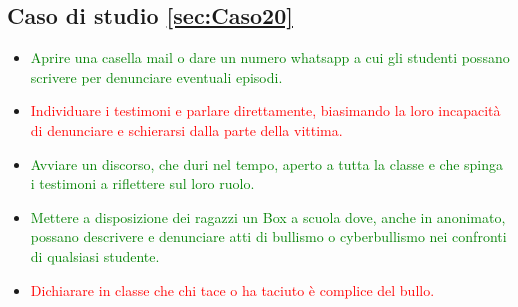\documentclass{article}
\begin{document}
\subsection{Caso di studio \ref{sec:Caso20}}
\begin{itemize}
	\item \textcolor{green}{Aprire una casella mail o dare un numero whatsapp a cui gli studenti possano scrivere per denunciare eventuali episodi.}		
	\item \textcolor{red}{Individuare i testimoni e parlare direttamente, biasimando la loro incapacità di denunciare e schierarsi dalla parte della vittima.}		
	\item \textcolor{green}{Avviare un discorso, che duri nel tempo, aperto a tutta la classe e che spinga i testimoni a riflettere sul loro ruolo.}		
	\item \textcolor{green}{Mettere a disposizione dei ragazzi un Box a scuola dove, anche in anonimato, possano descrivere e denunciare atti di bullismo o cyberbullismo nei confronti di qualsiasi studente.}		
	\item \textcolor{red}{Dichiarare in classe che chi tace o ha taciuto è complice del bullo.}
\end{itemize}
\end{document}
